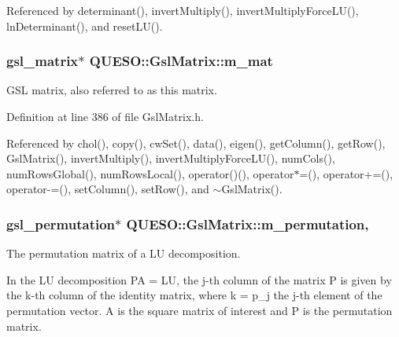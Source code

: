 Referenced by determinant(), invert\-Multiply(), invert\-Multiply\-Force\-L\-U(), ln\-Determinant(), and reset\-L\-U().

\hypertarget{class_q_u_e_s_o_1_1_gsl_matrix_a2cac0bd065e280a06445f944d5f3e3b3}{
\subsubsection[{m\-\_\-mat}]{\setlength{\rightskip}{0pt plus 5cm}gsl\-\_\-matrix$\ast$ Q\-U\-E\-S\-O\-::\-Gsl\-Matrix\-::m\-\_\-mat\hspace{0.3cm}{\ttfamily [private]}}}\label{class_q_u_e_s_o_1_1_gsl_matrix_a2cac0bd065e280a06445f944d5f3e3b3}


G\-S\-L matrix, also referred to as {\ttfamily this} matrix. 



Definition at line 386 of file Gsl\-Matrix.\-h.



Referenced by chol(), copy(), cw\-Set(), data(), eigen(), get\-Column(), get\-Row(), Gsl\-Matrix(), invert\-Multiply(), invert\-Multiply\-Force\-L\-U(), num\-Cols(), num\-Rows\-Global(), num\-Rows\-Local(), operator()(), operator$\ast$=(), operator+=(), operator-\/=(), set\-Column(), set\-Row(), and $\sim$\-Gsl\-Matrix().

\hypertarget{class_q_u_e_s_o_1_1_gsl_matrix_a673277a250dca216e0e414110f63a9af}{
\subsubsection[{m\-\_\-permutation}]{\setlength{\rightskip}{0pt plus 5cm}gsl\-\_\-permutation$\ast$ Q\-U\-E\-S\-O\-::\-Gsl\-Matrix\-::m\-\_\-permutation\hspace{0.3cm}{\ttfamily [mutable]}, {\ttfamily [private]}}}\label{class_q_u_e_s_o_1_1_gsl_matrix_a673277a250dca216e0e414110f63a9af}


The permutation matrix of a L\-U decomposition. 

In the L\-U decomposition P\-A = L\-U, the j-\/th column of the matrix P is given by the k-\/th column of the identity matrix, where k = p\-\_\-j the j-\/th element of the permutation vector. A is the square matrix of interest and P is the permutation matrix. 

